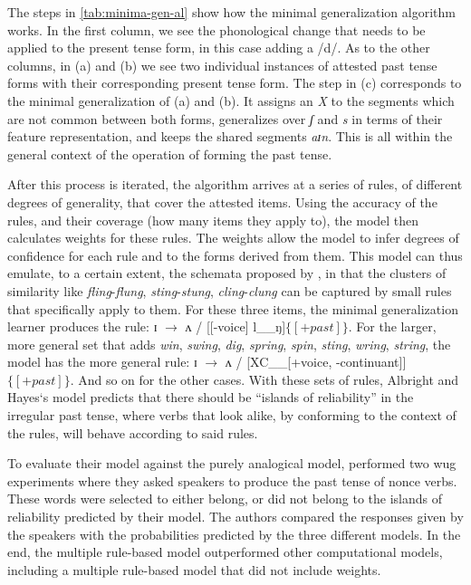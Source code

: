 The steps in \ref{tab:minima-gen-al} show how the minimal generalization algorithm works. In the first column, we see the phonological change that needs to be applied to the present tense form, in this case adding a /d/. As to the other columns, in (a) and (b) we see two individual instances of attested past tense forms with their corresponding present tense form. The step in (c) corresponds to the minimal generalization of (a) and (b). It assigns an \textit{X} to the segments which are not common between both forms, generalizes over \textit{ʃ} and \textit{s} in terms of their feature representation, and keeps the shared segments \textit{aɪn}. This is all within the general context of the operation of forming the past tense.

After this process is iterated, the algorithm arrives at a series of rules, of different degrees of generality, that cover the attested items. Using the accuracy of the rules, and their coverage (how many items they apply to), the model then calculates weights for these rules. The weights allow the model to infer degrees of confidence for each rule and to the forms derived from them. This model can thus emulate, to a certain extent, the schemata proposed by \textcite{Bybee.1982}, in that the clusters of similarity like \textit{fling}-\textit{flung}, \textit{sting}-\textit{stung}, \textit{cling}-\textit{clung} can be captured by small rules that specifically apply to them. For these three items, the minimal generalization learner produces the rule: ɪ $\rightarrow$ ʌ / [[-voice] l\_\_ŋ]$\{[+past]\}$. For the larger, more general set that adds \textit{win}, \textit{swing}, \textit{dig}, \textit{spring}, \textit{spin}, \textit{sting}, \textit{wring}, \textit{string}, the model has the more general rule: ɪ $\rightarrow$ ʌ / [XC\_\_[+voice, -continuant]]$\{[+past]\}$. And so on for the other cases. With these sets of rules, Albright and Hayes`s model predicts that there should be ``islands of reliability'' in the irregular past tense, where verbs that look alike, by conforming to the context of the rules, will behave according to said rules.

To evaluate their model against the purely analogical model, \textcite{Albright.2003} performed two wug experiments where they asked speakers to produce the past tense of nonce verbs. These words were selected to either belong, or did not belong to the islands of reliability predicted by their model. The authors compared the responses given by the speakers with the probabilities predicted by the three different models. In the end, the multiple rule-based model outperformed other computational models, including a multiple rule-based model that did not include weights.

